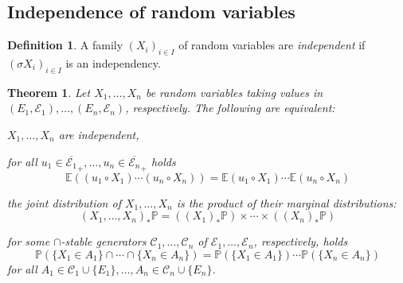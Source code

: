 \documentclass[11pt, a4paper, openany]{book}
\newtheorem{thm}{Theorem}\newtheorem{lem}{Lemma}\newtheorem{crl}{Corollary}
\theoremstyle{definition}
\newtheorem{define}{Definition}\newtheorem{exam}{Example}\newtheorem{remark}{Remark}
\newenvironment{tight_enumerate}{\begin{enumerate}\itemsep -0.2em}{\end{enumerate}}
\begin{document}
\subsection{Independence of random variables}
    \begin{define}
        A family $(X_i)_{i\in I}$ of random variables are \textit{independent} if $(\sigma X_i)_{i\in I}$ is an independency.
    \end{define}
    \begin{thm}\label{independence of random variables}
        Let $X_1,\dots, X_n$ be random variables taking values in $(E_1,\mathscr{E}_1),\dots,(E_n,\mathscr{E}_n)$, respectively. The following are equivalent:
        \begin{tight_enumerate}
            \item $X_1,\dots, X_n$ are independent,
            \item 
            for all $u_1\in \overline{\mathscr{E}_1}_+,\dots,u_n\in\overline{\mathscr{E}_n}_+$ holds
            \begin{equation}\label{independence of random variables in terms of expectation}
                \mathbb{E}((u_1\circ X_1)\cdots (u_n\circ X_n))=\mathbb{E}(u_1\circ X_1)\cdots\mathbb{E}(u_n\circ X_n)
            \end{equation}
            \item the joint distribution of $X_1,\dots, X_n$ is the product of their marginal distributions:
            \begin{equation}\label{independence of random variables in terms of distributions}
                (X_1,\dots,X_n)_*\mathbb{P}=((X_1)_*\mathbb{P})\times\cdots \times((X_n)_*\mathbb{P})
            \end{equation}
            \item for some $\cap$-stable generators $\mathscr{C}_1,\dots,\mathscr{C}_n$ of $\mathscr{E}_1,\dots,\mathscr{E}_n$, respectively, holds
            \begin{equation}\label{eq:criterion for independence of random variables}
                \mathbb{P}(\{X_1\in A_1\}\cap \cdots\cap \{X_n\in A_n\})=\mathbb{P}(\{X_1\in A_1\})\cdots\mathbb{P}(\{X_n\in A_n\})
            \end{equation}
            for all $A_1\in \mathscr{C}_1\cup\{E_1\},\dots,A_n\in\mathscr{C}_n\cup\{E_n\}$.
        \end{tight_enumerate}
    \end{thm}
\end{document}
